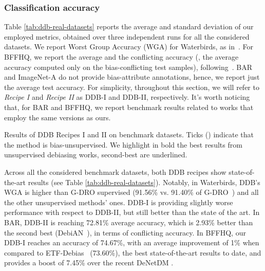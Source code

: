 \subsubsection{Classification accuracy}
Table \ref{tab:ddb-real-datasets} reports the average and standard deviation of our employed metrics, obtained over three independent runs for all the considered datasets. We report Worst Group Accuracy (WGA) for Waterbirds, as in~\cite{Sagawa*2020Distributionally, Lee_Park_Kim_Lee_Choi_Choo_2023}. For BFFHQ, we report the average and the conflicting accuracy (\ie, the average accuracy computed only on the bias-conflicting test samples), following~\cite{kim2021biaswap, li2022discover}. BAR and ImageNet-A do not provide bias-attribute annotations, hence, we report just the average test accuracy. For simplicity, throughout this section, we will refer to \textit{Recipe I} and \textit{Recipe II} as DDB-I and DDB-II, respectively. It's worth noticing that, for BAR and BFFHQ, we report benchmark results related to works that employ the same versions as ours. 
\begin{table}[!hb]
    \centering
    
    \caption{Results of DDB Recipes I and II on benchmark datasets. Ticks (\textcolor{green}{\tick}) indicate that the method is bias-unsupervised. We highlight in bold the best results from unsupervised debiasing works, second-best are underlined.}
    \label{tab:ddb-real-datasets}
\end{table}
Across all the considered benchmark datasets, both DDB recipes show state-of-the-art results (see Table \ref{tab:ddb-real-datasets}). Notably, in Waterbirds, DDB's WGA is higher than G-DRO supervised (91.56\% vs. 91.40\% of G-DRO~\cite{Sagawa*2020Distributionally}) and all the other unsupervised methods' ones. DDB-I is providing slightly worse performance with respect to DDB-II, but still better than the state of the art. 
In BAR, DDB-II is reaching 72.81\% average accuracy, which is 2.93\% better than the second best (DebiAN~\cite{li2022discover}), in terms of conflicting accuracy. In BFFHQ, our DDB-I reaches an accuracy of 74.67\%, with an average improvement of 1\% when compared to ETF-Debias~\cite{wang2024navigate} (73.60\%), the best state-of-the-art results to date, and provides a boost of 7.45\% over the recent DeNetDM \cite{vadakkeeveetil2024denetdm}.
